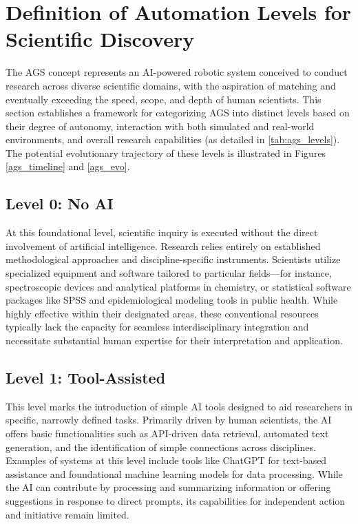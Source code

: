 \section*{Definition of Automation Levels for Scientific Discovery}


The AGS concept represents an AI-powered robotic system conceived to conduct research across diverse scientific domains, with the aspiration of matching and eventually exceeding the speed, scope, and depth of human scientists. This section establishes a framework for categorizing AGS into distinct levels based on their degree of autonomy, interaction with both simulated and real-world environments, and overall research capabilities (as detailed in \autoref{tab:ags_levels}). The potential evolutionary trajectory of these levels is illustrated in Figures \ref{ags_timeline} and \ref{ags_evo}.



\subsection*{Level 0: No AI}

At this foundational level, scientific inquiry is executed without the direct involvement of artificial intelligence. Research relies entirely on established methodological approaches and discipline-specific instruments. Scientists utilize specialized equipment and software tailored to particular fields—for instance, spectroscopic devices and analytical platforms in chemistry, or statistical software packages like SPSS and epidemiological modeling tools in public health. While highly effective within their designated areas, these conventional resources typically lack the capacity for seamless interdisciplinary integration and necessitate substantial human expertise for their interpretation and application.



\subsection*{Level 1: Tool-Assisted}

This level marks the introduction of simple AI tools designed to aid researchers in specific, narrowly defined tasks. Primarily driven by human scientists, the AI offers basic functionalities such as API-driven data retrieval, automated text generation, and the identification of simple connections across disciplines. Examples of systems at this level include tools like ChatGPT for text-based assistance and foundational machine learning models for data processing. While the AI can contribute by processing and summarizing information or offering suggestions in response to direct prompts, its capabilities for independent action and initiative remain limited.



